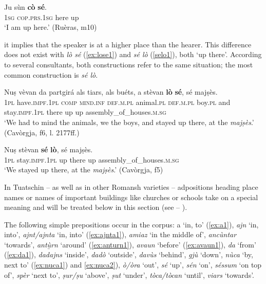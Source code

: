 \ea
\label{ex:cose1}
\gll Ju sùn \textbf{cò} \textbf{sé}.\\
\textsc{1sg} \textsc{cop.prs.1sg} here up\\
\glt `I am up here.' (Ruèras, m10)
\z

it implies that the speaker is at a higher place than the hearer. This difference does not exist with \textit{lò sé} (\ref{ex:lose1}) and \textit{sé lò} (\ref{selo1}), both `up there'. According to several consultants, both constructions refer to the same situation; the most common construction is \textit{sé lò}.

\ea
\label{ex:lose1}
\gll Nuṣ vèvan da partgirá als tiars, als buéts, a stèvan \textbf{lò} \textbf{sé}, sé majṣès.\\
\textsc{1pl} have.\textsc{impf.1pl} \textsc{comp} \textsc{mind.inf} \textsc{def.m.pl} animal.\textsc{pl} \textsc{def.m.pl} boy.\textsc{pl} and stay.\textsc{impf.1pl} there up up assembly\_of\_houses.\textsc{m.sg}\\
\glt `We had to mind the animals, we the boys, and stayed up there, at the \textit{majṣès}.' (Cavòrgja, f6, l. 2177ff.)
\z

\ea
\label{selo1}
\gll Nuṣ stèvan \textbf{sé} \textbf{lò}, sé majṣès.\\
\textsc{1pl} stay.\textsc{impf.1pl} up there up assembly\_of\_houses.\textsc{m.sg}\\
\glt `We stayed up there, at the \textit{majṣès}.' (Cavòrgja, f5)
\z

In Tuatschin -- as well as in other Romansh varieties -- adpositions heading place names or names of important buildings like churches or schools take on a special meaning and will be treated below in this section (see  -- ).

The following simple prepositions occur in the corpus: a `in, to' (\ref{ex:a1}), \textit{ajn} `in, into', \textit{ajnt/ajnta} `in, into' (\ref{ex:ajnta1}), \textit{amiaz} `in the middle of', \textit{ancùntar} `towards', \textit{antù̱rn} `around' (\ref{ex:anturn1}), \textit{avaun} `before' (\ref{ex:avaun1}), \textit{da} `from' (\ref{ex:da1}), \textit{dadajns} `inside', \textit{dadò} `outside', \textit{\textit{davùs}} `behind', \textit{gjù} `down', \textit{nùca} `by, next to' (\ref{ex:nuca1}) and \ref{ex:nuca2}), \textit{ò/òra} `out', \textit{sé} `up', \textit{sén} `on', \textit{séssum} `on top of', \textit{spèr} `next to', \textit{ṣur/ṣu} `above', \textit{ṣut} `under', \textit{tòca/tòcan} `until', \textit{viars} `towards'.

